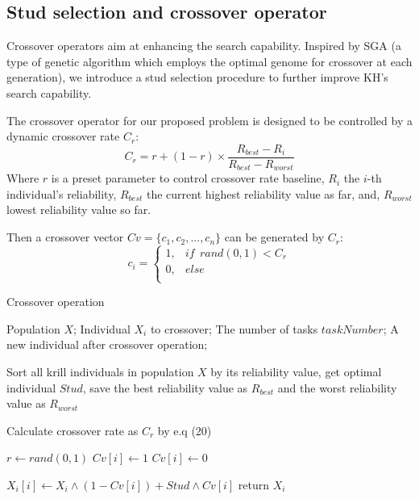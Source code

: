 \documentclass[journal]{IEEEtran}
\begin{document}
\subsection{Stud selection and crossover operator}

Crossover operators aim at enhancing the search capability. Inspired by SGA \cite{wang2014stud} (a type of genetic algorithm which employs the optimal genome for crossover at each generation), we introduce a stud selection procedure to further improve KH's search capability.

The crossover operator for our proposed problem is designed to be controlled by a dynamic crossover rate $C_{r}$:
\begin{equation}
C_{r} = r + (1-r) \times \frac{R_{best}-R_{i}}{R_{best}-R_{worst}}
\end{equation}
Where $r$ is a preset parameter to control crossover rate baseline, $R_{i}$ the $i$-th individual's reliability, $R_{best}$ the current highest reliability value as far, and, $R_{worst}$ lowest reliability value so far.

Then a crossover vector $Cv = \{c_{1},c_{2},...,c_{n}\}$ can be generated by $C_{r}$:
\begin{equation}
c_{i}=
\begin{cases}
1,& if \ \ rand(0,1) < C_{r}\\
0,& else\\
\end{cases}
\end{equation}

\begin{algorithm}
\caption{Crossover operation}
\label{alg1}
\begin{algorithmic}[1]

\REQUIRE Population $X$; Individual $X_i$ to crossover; The number of tasks $taskNumber$; 
\ENSURE A new individual after crossover operation;

\STATE Sort all krill individuals in population $X$ by its reliability value, get optimal individual $Stud$, save the best reliability value as $R_{best}$ and the worst reliability value as $R_{worst}$

\STATE Calculate crossover rate as $C_{r}$ by e.q (20)

\STATE $r \leftarrow rand(0,1)$
\STATE $Cv[i] \leftarrow 1$
\ELSE
\STATE $Cv[i] \leftarrow 0$
\ENDIF
\ENDFOR

\STATE $X_i[i] \leftarrow X_i \wedge  (1-Cv[i]) + Stud \wedge Cv[i]$ 
\ENDFOR
\STATE return $X_i$
\end{algorithmic}
\end{algorithm}
\end{document}
